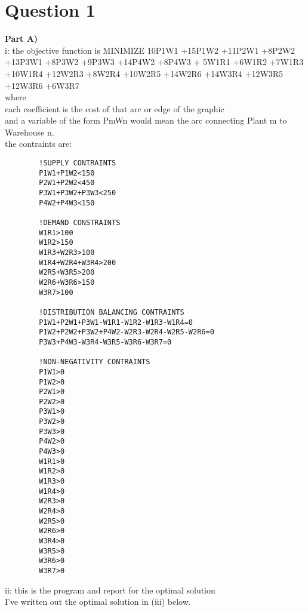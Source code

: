 \clearpage
\section*{Question 1}
\textbf{Part A)}\\

i: the objective function is MINIMIZE 10P1W1 +15P1W2 +11P2W1 +8P2W2 +13P3W1 +8P3W2 +9P3W3 +14P4W2 +8P4W3 
+
5W1R1 +6W1R2 +7W1R3 +10W1R4 +12W2R3 +8W2R4 +10W2R5 +14W2R6 +14W3R4 +12W3R5 +12W3R6 +6W3R7\\ 
where \\
each coefficient is the cost of that arc or edge of the graphic\\
and a variable of the form PmWn would mean the arc connecting Plant m to Warehouse n.\\

the contraints are:\\
\begin{verbatim}
        !SUPPLY CONTRAINTS
        P1W1+P1W2<150
        P2W1+P2W2<450
        P3W1+P3W2+P3W3<250
        P4W2+P4W3<150

        !DEMAND CONSTRAINTS
        W1R1>100
        W1R2>150
        W1R3+W2R3>100
        W1R4+W2R4+W3R4>200
        W2R5+W3R5>200
        W2R6+W3R6>150
        W3R7>100        

        !DISTRIBUTION BALANCING CONTRAINTS
        P1W1+P2W1+P3W1-W1R1-W1R2-W1R3-W1R4=0
        P1W2+P2W2+P3W2+P4W2-W2R3-W2R4-W2R5-W2R6=0
        P3W3+P4W3-W3R4-W3R5-W3R6-W3R7=0

        !NON-NEGATIVITY CONTRAINTS
        P1W1>0
        P1W2>0
        P2W1>0
        P2W2>0
        P3W1>0
        P3W2>0
        P3W3>0
        P4W2>0
        P4W3>0
        W1R1>0
        W1R2>0
        W1R3>0
        W1R4>0
        W2R3>0
        W2R4>0
        W2R5>0
        W2R6>0
        W3R4>0
        W3R5>0
        W3R6>0
        W3R7>0
\end{verbatim}

ii: this is the program and report for the optimal solution\\
I've written out the optimal solution in (iii) below.\\

